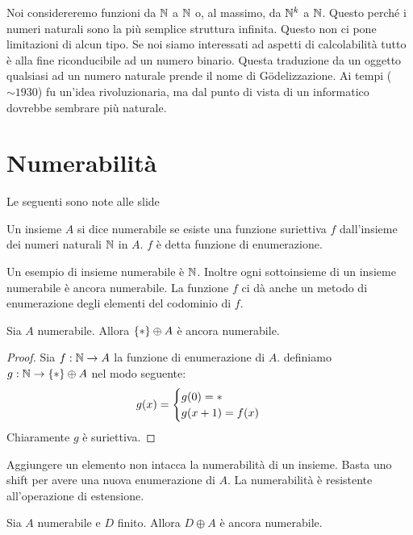 Noi considereremo funzioni da $\mathbb{N}$ a $\mathbb{N}$ o, al massimo, da $\mathbb{N}^{k}$ a $\mathbb{N}$. Questo perché
i numeri naturali sono la più semplice struttura infinita. Questo non ci pone limitazioni di alcun
tipo. Se noi siamo interessati ad aspetti di calcolabilità tutto è alla fine riconducibile ad un
numero binario. Questa traduzione da un oggetto qualsiasi ad un numero naturale prende il nome di
Gödelizzazione. Ai tempi ($\sim 1930$) fu un'idea rivoluzionaria, ma dal punto di vista di un informatico
dovrebbe sembrare più naturale.

\section{Numerabilità}

Le seguenti sono note alle slide

\begin{defn}
    Un insieme $A$ si dice numerabile se esiste una funzione suriettiva $f$ dall'insieme
    dei numeri naturali $\mathbb{N}$ in $A$. $f$ è detta funzione di enumerazione.
\end{defn}

Un esempio di insieme numerabile è $\mathbb{N}$. Inoltre ogni sottoinsieme di un insieme numerabile è
ancora numerabile. La funzione $f$ ci dà anche un metodo di enumerazione degli elementi del
codominio di $f$.

\begin{lem}
   Sia $A$ numerabile. Allora $\{*\} \oplus A$ è ancora numerabile.
\end{lem}
\begin{proof}
    Sia $f : \mathbb{N} \to A$ la funzione di enumerazione di $A$. definiamo $g : \mathbb{N} \to \{*\} \oplus A$
    nel modo seguente:
    \begin{equation*}
        g(x) =
        \begin{cases}
            g(0)=* \quad &\text{}\\
            g(x+1)=f(x) \quad &\text{}\\
        \end{cases}
    \end{equation*}
    Chiaramente $g$ è suriettiva.
\end{proof}

Aggiungere un elemento non intacca la numerabilità di un insieme. Basta uno shift per avere una
nuova enumerazione di $A$. La numerabilità è resistente all'operazione di estensione.
\begin{cor}
    Sia $A$ numerabile e $D$ finito. Allora $D \oplus A$ è ancora numerabile.
\end{cor}

